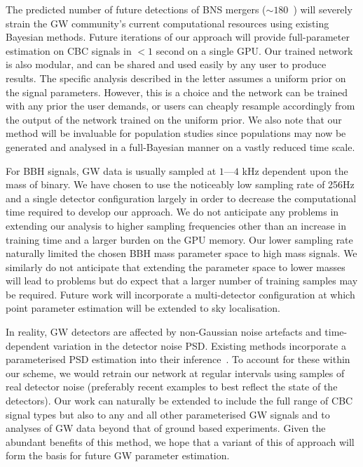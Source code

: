 \documentclass[%
showpacs,
 amsmath,amssymb,
 aps,
 twocolumn,
 prl,
 reprint,
floatfix,
]{revtex4-1}
\begin{document}
%
%
The predicted number of future detections of \ac{BNS} mergers ($\sim
180$~\cite{1304.0670,1811.12907}) will severely strain the \ac{GW} community's
current computational resources using existing Bayesian methods. Future
iterations of our approach will provide full-parameter estimation on \ac{CBC}
signals in $<1$ second on a single \ac{GPU}. Our trained network is also modular, and can be shared and used easily by any user to produce
results. The specific analysis described in the letter assumes a uniform prior
on the signal parameters. However, this is a choice and the network can be
trained with any prior the user demands, or users can cheaply resample
accordingly from the output of the network trained on the uniform prior. We
also note that our method will be invaluable for population studies since
populations may now be generated and analysed in a full-Bayesian manner on a
vastly reduced time scale. 

%
%
For \ac{BBH} signals, \ac{GW} data is usually sampled at $1$---$4$ kHz
dependent upon the mass of binary. We have chosen to use the noticeably low
sampling rate of 256Hz and a single detector configuration largely in order to
decrease the computational time required to develop our approach. We do not
anticipate any problems in extending our analysis to higher sampling
frequencies other than an increase in training time and a larger burden on the
\ac{GPU} memory. Our lower sampling rate naturally limited the chosen \ac{BBH}
mass parameter space to high mass signals. We similarly do not anticipate that
extending the parameter space to lower masses will lead to problems but do
expect that a larger number of training samples may be required. Future work
will incorporate a multi-detector configuration at which point parameter
estimation will be extended to sky localisation. 

%
%
In reality, \ac{GW} detectors are affected by non-Gaussian noise artefacts and
time-dependent variation in the detector noise \ac{PSD}. Existing methods
incorporate a parameterised \ac{PSD} estimation into their
inference~\cite{2015PhRvD..91h4034L}. To account for these within our scheme,
we would retrain our network at regular intervals using samples of real
detector noise (preferably recent examples to best reflect the state of the
detectors). Our work can naturally be extended to include the full range of
\ac{CBC} signal types but also to any and all other parameterised \ac{GW}
signals and to analyses of \ac{GW} data beyond that of ground based
experiments. Given the abundant benefits of this method, we hope that a variant
of this of approach will form the basis for future \ac{GW} parameter
estimation.
%
%
\end{document}
